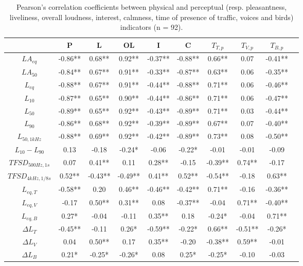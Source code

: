 \documentclass[twocolumn]{article}
\begin{document}
\begin{table}[ht!]
\centering
\caption{Pearson's correlation coefficients between physical and perceptual (resp. pleasantness, liveliness, overall loudness, interest, calmness, time of presence of traffic, voices and birds) indicators (n = 92).}
\label{tab:physc}
\begin{threeparttable}[t]
\begin{tabular}{ c | c c c c c | c c c c }
\hline
	 & P & L & OL & I & C & $T_{T, p}$ & $T_{V, p}$ & $T_{B, p}$ \\ \hline
	$LA_{eq}$ & -0.86** & 0.68** & 0.92** & -0.37** & -0.88** & 0.66** & 0.07 & -0.41** \\
	$LA_{50}$ & -0.84** & 0.67** & 0.91** & -0.33** & -0.87** & 0.63** & 0.06 & -0.35** \\
	$L_{eq}$ & -0.88** & 0.67** & 0.91** & -0.44** & -0.88** & 0.71** & 0.06 & -0.46** \\
	$L_{10}$ & -0.87** & 0.65** & 0.90** & -0.44** & -0.86** & 0.71** & 0.06 & -0.47** \\
	$L_{50}$ & -0.89** & 0.65** & 0.92** & -0.43** & -0.89** & 0.71** & 0.03 & -0.44** \\
	$L_{90}$ & -0.86** & 0.68** & 0.92** & -0.39** & -0.89** & 0.67** & 0.07 & -0.40** \\
	$L_{50, 1kHz}$ & -0.88** & 0.69** & 0.92** & -0.42** & -0.89** & 0.73** & 0.08 & -0.50** \\
	$L_{10}-L_{90}$ & 0.13 & -0.18 & -0.24* & -0.06 & -0.22* & -0.01 & -0.01 & -0.09 \\ \hline
	$TFSD_{500Hz, 1s}$ & 0.07 & 0.41** & 0.11 & 0.28** & -0.15 & -0.39** & 0.74** & -0.17 \\
	$TFSD_{4kHz, 1/8s}$ & 0.52** & -0.43** & -0.49** & 0.41** & 0.52** & -0.54** & -0.18 & 0.63** \\ \hline
	$L_{eq, T}$ & -0.58** & 0.20 & 0.46** & -0.46** & -0.42** & 0.71** & -0.16 & -0.36** \\
	$L_{eq, V}$ & -0.17 & 0.50** & 0.31** & 0.08 & -0.37** & -0.04 & 0.71** & -0.40** \\
	$L_{eq, B}$ & 0.27* & -0.04 & -0.11 & 0.35** & 0.18 & -0.24* & -0.04 & 0.71** \\ \hline
	$\Delta L_T$ & -0.45** & -0.11 & 0.26* & -0.59** & -0.22* & 0.66** & -0.51** & -0.26* \\
	$\Delta L_V$ & 0.04 & 0.50** & 0.17 & 0.35** & -0.20 & -0.38** & 0.59** & -0.01 \\
	$\Delta L_B$ & 0.21* & -0.25* & -0.26* & 0.08 & 0.25* & -0.25* & -0.10 & -0.03 \\ \hline

\end{tabular}
\end{threeparttable}
\end{table}
\end{document}
